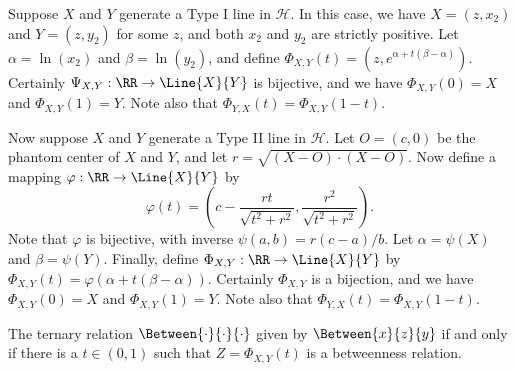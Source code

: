 Suppose \(X\) and \(Y\) generate a Type I line in \(\mathcal{H}\).
In this case, we have \(X = (z,x_2)\) and \(Y = (z,y_2)\) for some \(z\), and both \(x_2\) and \(y_2\) are strictly positive.
Let \(\alpha = \ln(x_2)\) and \(\beta = \ln(y_2)\), and define \(\Phi_{X,Y}(t) = (z, e^{\alpha + t(\beta - \alpha)})\).
Certainly \(\Psi_{X,Y} : \RR \rightarrow \Line{X}{Y}\) is bijective, and we have \(\Phi_{X,Y}(0) = X\) and \(\Phi_{X,Y}(1) = Y\).
Note also that \(\Phi_{Y,X}(t) = \Phi_{X,Y}(1-t)\).

Now suppose \(X\) and \(Y\) generate a Type II line in \(\mathcal{H}\).
Let \(O = (c,0)\) be the phantom center of \(X\) and \(Y\), and let \(r = \sqrt{(X-O) \cdot (X-O)}\).
Now define a mapping \(\varphi : \RR \rightarrow \Line{X}{Y}\) by \[ \varphi(t) = \left(c - \frac{rt}{\sqrt{t^2 + r^2}}, \frac{r^2}{\sqrt{t^2 + r^2}} \right).\]
Note that \(\varphi\) is bijective, with inverse \(\psi(a,b) = r(c-a)/b\).
Let \(\alpha = \psi(X)\) and \(\beta = \psi(Y)\).
Finally, define \(\Phi_{X,Y} : \RR \rightarrow \Line{X}{Y}\) by \(\Phi_{X,Y}(t) = \varphi(\alpha + t(\beta - \alpha))\).
Certainly \(\Phi_{X,Y}\) is a bijection, and we have \(\Phi_{X,Y}(0) = X\) and \(\Phi_{X,Y}(1) = Y\).
Note also that \(\Phi_{Y,X}(t) = \Phi_{X,Y}(1-t)\).

\begin{prop}
The ternary relation \(\Between{\cdot}{\cdot}{\cdot}\) given by \(\Between{x}{z}{y}\) if and only if there is a \(t \in (0,1)\) such that \(Z = \Phi_{X,Y}(t)\) is a betweenness relation.
\end{prop}

